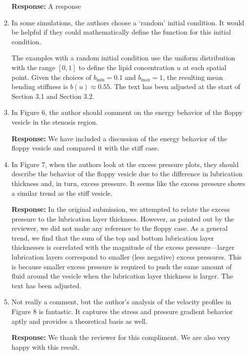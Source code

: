 \documentclass[11pt]{article}
\begin{document}
\begin{enumerate}
\noindent
{\bf Response:} A response

\item In some simulations, the authors choose a `random' initial
  condition. It would be helpful if they could mathematically define the
    function for this initial condition.

 The examples with a random initial condition
    use the uniform distribution with the range $[0,1]$ to define the
    lipid concentration $u$ at each spatial point. Given the choices of
    $b_{\min}=0.1$ and $b_{\max}=1$, the resulting mean bending
    stiffness is $\overline{b(u)} \approx 0.55$. The text has been
    adjusted at the start of Section 3.1 and Section 3.2.

\item In Figure 6, the author should comment on the energy behavior of
  the floppy vesicle in the stenosis region.

\noindent
{\bf Response:} We have included a discussion of the energy behavior of
the floppy vesicle and compared it with the stiff case.

\item In Figure 7, when the authors look at the excess pressure plots,
  they should describe the behavior of the floppy vesicle due to the
  difference in lubrication thickness and, in turn, excess pressure. It
  seems like the excess pressure shows a similar trend as the stiff
  vesicle.

\noindent
{\bf Response:} In the original submission, we attempted to relate the
excess pressure to the lubrication layer thickness. However, as pointed
out by the reviewer, we did not make any reference to the floppy case.
As a general trend, we find that the sum of the top and bottom
lubrication layer thicknesses is correlated with the magnitude of the
excess pressure---larger lubrication layers correspond to smaller (less
negative) excess pressures. This is because smaller excess pressure is
required to push the same amount of fluid around the vesicle when the
lubrication layer thickness is larger. The text has been adjusted.


\item Not really a comment, but the author's analysis of the velocity
  profiles in Figure 8 is fantastic. It captures the stress and pressure
  gradient behavior aptly and provides a theoretical basis as well.

\noindent
{\bf Response:} We thank the reviewer for this compliment. We are also
very happy with this result. 


\end{enumerate}
\end{document}
